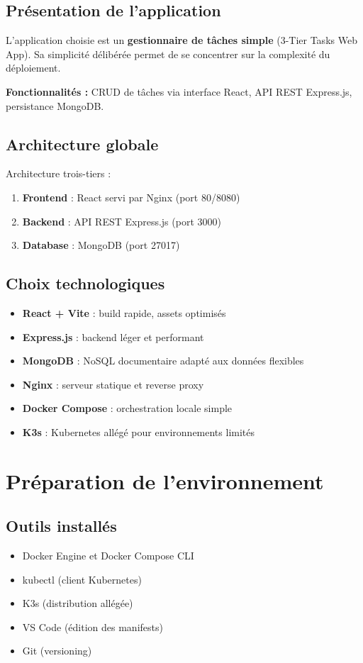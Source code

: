 \documentclass[12pt,a4paper]{report}
\begin{document}
\section{Présentation de l'application}

L'application choisie est un \textbf{gestionnaire de tâches simple} (3-Tier Tasks Web App). Sa simplicité délibérée permet de se concentrer sur la complexité du déploiement.

\textbf{Fonctionnalités :} CRUD de tâches via interface React, API REST Express.js, persistance MongoDB.

\section{Architecture globale}

Architecture trois-tiers :
\begin{enumerate}
\item \textbf{Frontend} : React servi par Nginx (port 80/8080)
\item \textbf{Backend} : API REST Express.js (port 3000)
\item \textbf{Database} : MongoDB (port 27017)
\end{enumerate}

\section{Choix technologiques}
\begin{itemize}
\item \textbf{React + Vite} : build rapide, assets optimisés
\item \textbf{Express.js} : backend léger et performant
\item \textbf{MongoDB} : NoSQL documentaire adapté aux données flexibles
\item \textbf{Nginx} : serveur statique et reverse proxy
\item \textbf{Docker Compose} : orchestration locale simple
\item \textbf{K3s} : Kubernetes allégé pour environnements limités
\end{itemize}

\chapter{Préparation de l'environnement}

\section{Outils installés}
\begin{itemize}
\item Docker Engine et Docker Compose CLI
\item kubectl (client Kubernetes)
\item K3s (distribution allégée)
\item VS Code (édition des manifests)
\item Git (versioning)
\end{itemize}
\end{document}
